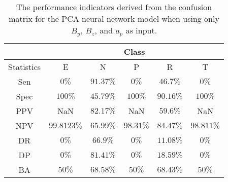 \begin{table}[!ht]
	\centering
	\begin{tabular}{|c|c|c|c|c|c|}
		\hline
		 & \multicolumn{5}{c|}{Class} \\ \hline
		Statistics & E & N & P & R & T \\ \hline
		Sen & $0\%$ & $91.37\%$ & $0\%$ & $46.7\%$ & $0\%$ \\ \hline
		Spec & $100\%$ & $45.79\%$ & $100\%$ & $90.16\%$ & $100\%$ \\ \hline
		PPV & NaN & $82.17\%$ & NaN & $59.6\%$ & NaN \\ \hline
		NPV & $99.8123\%$ & $65.99\%$ & $98.31\%$ & $84.47\%$ & $98.811\%$ \\ \hline
		DR & $0\%$ & $66.9\%$ & $0\%$ & $11.08\%$ & $0\%$ \\ \hline
		DP & $0\%$ & $81.41\%$ & $0\%$ & $18.59\%$ & $0\%$ \\ \hline
		BA & $50\%$ & $68.58\%$ & $50\%$ & $68.43\%$ & $50\%$ \\ \hline
	\end{tabular}
	\caption{The performance indicators derived from the confusion matrix for the PCA neural network model when using only $B_{y}$, $B_{z}$, and $a_{p}$ as input.}
	\label{tab:cs:reverse:yzap:pcaNNet}
\end{table}
